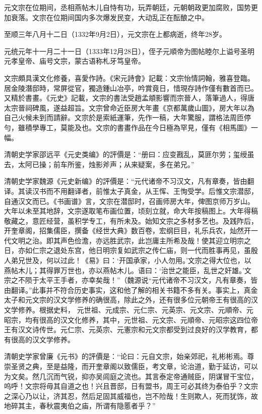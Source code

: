 元文宗在位期间，丞相燕帖木儿自恃有功，玩弄朝廷，元朝朝政更加腐败，国势更加衰落。文宗在位期间国内多次爆发民变，大动乱正在酝酿之中。

至顺三年八月十二日（1332年9月2日），元文宗在上都病逝，终年28岁。

元统元年十一月二十一日（1333年12月28日），侄子元順帝为图帖睦尔上谥号圣明元孝皇帝、庙号文宗，蒙古语称札牙笃皇帝。

文宗頗具漢文化修養，喜愛作詩。《宋元詩會》記載：文宗怡情詞翰，雅喜登臨。居金陵潛邸時，常屏從官，獨造鍾山冶亭，吟賞竟日，惜現存詩作僅有數首而已。又精於書畫。《元史》記載，文宗的書法受趙孟頫影響而宗晉人，落筆過人，得唐太宗晉祠碑風，遂益超旨。文宗曾命近臣房大年畫《京都萬歲山圖》，房大年以為自己火候未到而請辭。文宗於是索紙運筆，先作一稿，大年驚服，謂格法周匝停勻，雖積學專工，莫能及也。文宗的書畫作品在今日極為罕見，僅有《相馬圖》一幅。

清朝史学家邵远平《元史类编》的評價是：“册曰：应变戡乱，莫匪尔劳；玺绶虽去，太阿已操；前车所鉴，烛影斧声；从来疑案，多在弟兄。”

清朝史学家魏源《元史新编》的評價是：“元代诸帝不习汉文，凡有章奏，皆由翻译。其读汉书而不用翻译者，前惟太子真金，从王恽、王恂受学。后惟文宗潜邸，自通汉文而已。《书画谱》言，文宗在潜邸时，召画师房大年，俾图京师万岁山。大年以未至其地辞，文宗遂取笔布画位置，顷刻立就，命大年按稿图上。大年得稿敬藏之，意匠经营，虽积学专工，有所未及。始知文宗之多材多艺也。及践阼后，开奎章阁，招集儒臣，撰备《经世大典》数百卷，宏纲巨目，礼乐兵农，灿然开一代文明之治。即其声色俭澹，亦远胜武宗，此岂庸主所希及哉！使其迎立明宗之日，亦如仁宗之退处东宫，他日明宗复如武宗之传仁庙，则一代而胜事再见，虽殷人弟兄世及，何以过此！《易》曰：‘开国承家，小人勿用。’文宗之得大位也，以燕帖木儿；其得罪万世也，亦以燕帖木儿。语曰：‘治世之能臣，乱世之奸雄。’文宗之不陨于太平王手者，亦幸矣哉！”（魏源说“元代诸帝不习汉文，凡有章奏，皆由翻译。”此事并不符合历史事实，这和他了解的相关书籍不多有关。事实上，真金太子和元文宗的汉文学修养的确很高，除此之外，还有很多位元朝帝王有很高的汉文学修养。根据史料， 元世祖、元成宗、元仁宗、元英宗、元文宗、元順帝、元昭宗，均有很高的汉文化修养，其中，元世祖、元文宗、元順帝、元昭宗这四位帝王有汉文诗传世。元仁宗、元英宗、元憲宗和元文宗都受到过良好的汉学教育，都有很高的汉文学修养。

清朝史学家曾廉《元书》的評價是：“论曰：元自文宗，始亲郊祀，礼彬彬焉。尊崇圣贤之典，至是益隆，而开奎章阁以致儒臣，考文章，论治道，勤于延访，可以为文矣。然几沉而气锐，抑亦吴闾庭之流也。其言泰定帝通贼臣，阴谋冒干宝位，呜呼！文宗将毋其自道之也！兴且晋邸，日有盟书，周王可必其终为泰伯乎？文宗之深心乃以让，济其忍，然后足固其威福也，岂不险哉！生则欺人，死而犹饰，故地碎其主，春秋震夷伯之庙，所谓有隐慝者乎？”


